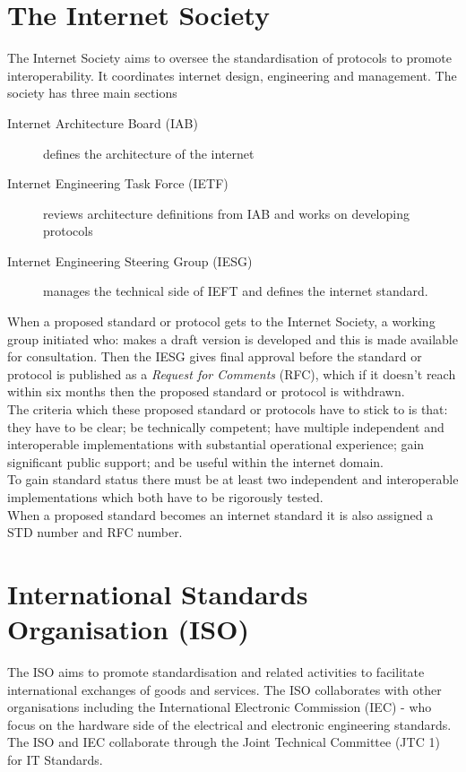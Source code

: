 
\section*{The Internet Society}
The Internet Society aims to oversee the standardisation of protocols to promote interoperability. It coordinates internet design, engineering and management. The society has three main sections
\begin{description}
    \item[Internet Architecture Board (IAB)] defines the architecture of the internet
    \item[Internet Engineering Task Force (IETF)] reviews architecture definitions from IAB and works on developing protocols
    \item[Internet Engineering Steering Group (IESG)] manages the technical side of IEFT and defines the internet standard. 
\end{description}

When a proposed standard or protocol gets to the Internet Society, a working group initiated who: makes a draft version is developed and this is made available for consultation. Then the IESG gives final approval before the standard or protocol is published as a \textit{Request for Comments} (RFC), which if it doesn't reach within six months then the proposed standard or protocol is withdrawn.\\ The criteria which these proposed standard or protocols have to stick to is that: they have to be clear; be technically competent; have multiple independent and interoperable implementations with substantial operational experience; gain significant public support; and be useful within the internet domain. \\
To gain standard status there must be at least two independent and interoperable implementations which both have to be rigorously tested.\\
When a proposed standard becomes an internet standard it is also assigned a STD number and RFC number. 

\section*{International Standards Organisation (ISO)}
The ISO aims to promote standardisation and related activities to facilitate international exchanges of goods and services. The ISO collaborates with other organisations including the International Electronic Commission (IEC) - who focus on the hardware side of the electrical and electronic engineering standards. The ISO and IEC collaborate through the Joint Technical Committee (JTC 1) for IT Standards.
